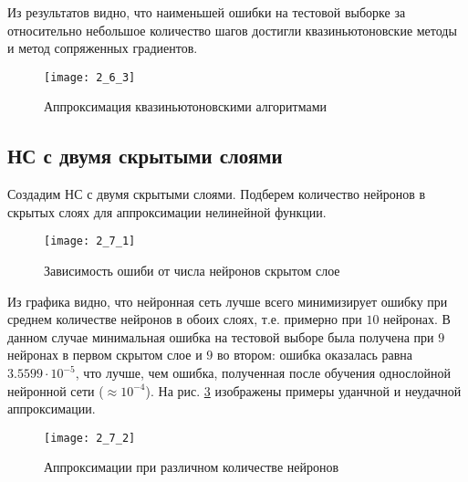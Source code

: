 Из результатов видно, что наименьшей ошибки на тестовой выборке за относительно небольшое количество шагов достигли квазиньютоновские методы и метод сопряженных градиентов.

\begin{figure}[H]
\begin{center}
	\texttt{[image: 2\_6\_3]}
	\caption{Аппроксимация квазиньютоновскими алгоритмами}
	\label{fig:2_6_3}
\end{center}
\end{figure}
\vspace{-1cm}

\subsection{НС с двумя скрытыми слоями}


Создадим НС с двумя скрытыми слоями. Подберем количество нейронов в скрытых слоях для аппроксимации нелинейной функции.
\vspace{-1cm}
\begin{figure}[H]
\begin{center}
	\texttt{[image: 2\_7\_1]}
	\caption{Зависимость ошиби от числа нейронов скрытом слое}
	\label{fig:2_7_1}
\end{center}
\end{figure}

Из графика видно, что нейронная сеть лучше всего минимизирует ошибку при среднем количестве нейронов в обоих слоях, т.е. примерно при $10$ нейронах. В данном случае минимальная ошибка на тестовой выборе была получена при $9$ нейронах в первом скрытом слое и $9$ во втором: ошибка оказалась равна $3.5599\cdot 10^{-5}$, что лучше, чем ошибка, полученная после обучения однослойной нейронной сети ($\approx 10^{-4}$). На рис. \ref{fig:2_7_2} изображены примеры уданчной и неудачной аппроксимации.

\begin{figure}[H]
\begin{center}
	\texttt{[image: 2\_7\_2]}
	\caption{Аппроксимации при различном количестве нейронов}
	\label{fig:2_7_2}
\end{center}
\end{figure}

